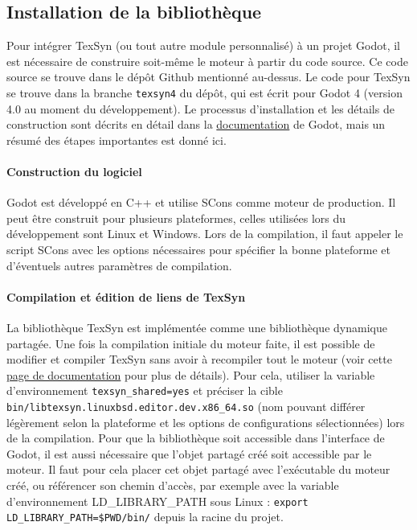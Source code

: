 \subsection{Installation de la bibliothèque}

Pour intégrer TexSyn (ou tout autre module personnalisé) à un projet Godot, il est nécessaire de construire soit-même le moteur à partir du code source. Ce code source se trouve dans le dépôt Github mentionné au-dessus. Le code pour TexSyn se trouve dans la branche \texttt{texsyn4} du dépôt, qui est écrit pour Godot 4 (version 4.0 au moment du développement). Le processus d'installation et les détails de construction sont décrits en détail dans la \href{https://docs.godotengine.org/en/stable/contributing/development/compiling/index.html}{documentation} de Godot, mais un résumé des étapes importantes est donné ici.

\paragraph{Construction du logiciel}

Godot est développé en C++ et utilise SCons comme moteur de production. Il peut être construit pour plusieurs plateformes, celles utilisées lors du développement sont Linux et Windows. Lors de la compilation, il faut appeler le script SCons avec les options nécessaires pour spécifier la bonne plateforme et d'éventuels autres paramètres de compilation.

\paragraph{Compilation et édition de liens de TexSyn}

La bibliothèque TexSyn est implémentée comme une bibliothèque dynamique partagée. Une fois la compilation initiale du moteur faite, il est possible de modifier et compiler TexSyn sans avoir à recompiler tout le moteur (voir cette \href{https://docs.godotengine.org/en/stable/contributing/development/core_and_modules/custom_modules_in_cpp.html}{page de documentation} pour plus de détails). Pour cela, utiliser la variable d'environnement \texttt{texsyn\_shared=yes} et préciser la cible \texttt{bin/libtexsyn.linuxbsd.editor.dev.x86\_64.so} (nom pouvant différer légèrement selon la plateforme et les options de configurations sélectionnées) lors de la compilation. Pour que la bibliothèque soit accessible dans l'interface de Godot, il est aussi nécessaire que l'objet partagé créé soit accessible par le moteur. Il faut pour cela placer cet objet partagé avec l'exécutable du moteur créé, ou référencer son chemin d'accès, par exemple avec la variable d'environnement LD\_LIBRARY\_PATH sous Linux : \texttt{export LD\_LIBRARY\_PATH=\$PWD/bin/} depuis la racine du projet.

